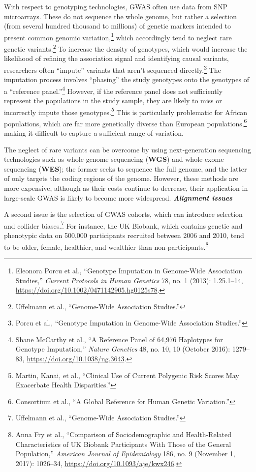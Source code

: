 \documentclass[
]{book}
\begin{document}
With respect to genotyping technologies, GWAS often use data from SNP microarrays. These do not sequence the whole genome, but rather a selection (from several hundred thousand to millions) of genetic markers intended to present common genomic variation,\footnote{Eleonora Porcu et al., {``Genotype {Imputation} in {Genome-Wide Association Studies},''} \emph{Current Protocols in Human Genetics} 78, no. 1 (2013): 1.25.1--14, \url{https://doi.org/10.1002/0471142905.hg0125s78}.} which accordingly tend to neglect rare genetic variants.\footnote{Uffelmann et al., {``Genome-Wide Association Studies.''}} To increase the density of genotypes, which would increase the likelihood of refining the association signal and identifying causal variants, researchers often ``impute'' variants that aren't sequenced directly.\footnote{Porcu et al., {``Genotype {Imputation} in {Genome-Wide Association Studies}.''}} The imputation process involves ``phasing'' the study genotypes onto the genotypes of a ``reference panel.''\footnote{Shane McCarthy et al., {``A Reference Panel of 64,976 Haplotypes for Genotype Imputation,''} \emph{Nature Genetics} 48, no. 10, 10 (October 2016): 1279--83, \url{https://doi.org/10.1038/ng.3643}.} However, if the reference panel does not sufficiently represent the populations in the study sample, they are likely to miss or incorrectly impute those genotypes.\footnote{Martin, Kanai, et al., {``Clinical Use of Current Polygenic Risk Scores May Exacerbate Health Disparities.''}} This is particularly problematic for African populations, which are far more genetically diverse than European populations,\footnote{Consortium et al., {``A Global Reference for Human Genetic Variation.''}} making it difficult to capture a sufficient range of variation.

The neglect of rare variants can be overcome by using next-generation sequencing technologies such as whole-genome sequencing (\textbf{WGS}) and whole-exome sequencing (\textbf{WES}); the former seeks to sequence the full genome, and the latter of only targets the coding regions of the genome. However, these methods are more expensive, although as their costs continue to decrease, their application in large-scale GWAS is likely to become more widespread. \textbf{\emph{Alignment issues}}

A second issue is the selection of GWAS cohorts, which can introduce selection and collider biases.\footnote{Uffelmann et al., {``Genome-Wide Association Studies.''}} For instance, the UK Biobank, which contains genetic and phenotypic data on 500,000 participants recruited between 2006 and 2010, tend to be older, female, healthier, and wealthier than non-participants.\footnote{Anna Fry et al., {``Comparison of {Sociodemographic} and {Health-Related Characteristics} of {UK Biobank Participants With Those} of the {General Population},''} \emph{American Journal of Epidemiology} 186, no. 9 (November 1, 2017): 1026--34, \url{https://doi.org/10.1093/aje/kwx246}.}
\end{document}
